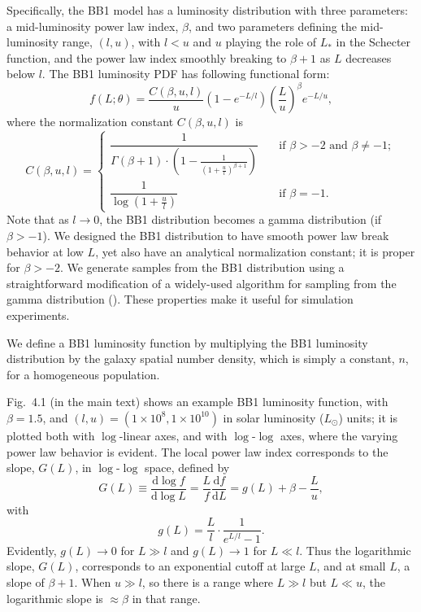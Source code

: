 \documentclass[12pt]{article}
\numberwithin{equation}{section}
\numberwithin{figure}{section}
\numberwithin{table}{section}
\newcommand{\dd}{\textrm{d}}
\newcommand{\lpdf}{f}
\begin{document}
Specifically, the BB1 model has a luminosity distribution with three parameters: a mid-luminosity power law index, $\beta$, and two parameters defining the mid-luminosity range, $(l, u)$, with $l < u$ and  $u$ playing the role of $L_*$ in the Schecter function, and the power law index smoothly breaking to $\beta+1$ as $L$ decreases below $l$.
The BB1 luminosity PDF has following functional form:
\begin{equation}
\label{eq:lumPDF} 
\lpdf(L ; \theta) = 
  \frac{C(\beta,u,l)}{u}\left(1-e^{-L/l}\right) \left(\frac{L}{u}\right)^{\beta} e^{-L/u},
\end{equation}
where the normalization constant $C(\beta,u,l)$ is
\begin{equation}
\label{eq:normLumPDF} 
C(\beta,u,l) =
  \begin{cases} \dfrac{1}{\Gamma(\beta+1)\cdot\left(1-\frac{1}{\left(1+\frac{u}{l}\right)^{\beta+1}}\right)} 
    & \quad \text{if } \beta > -2\text{ and }\beta \ne -1; \\
 \dfrac{1}{\log\left(1+\frac{u}{l}\right)} & \quad \text{if } \beta=-1.
  \end{cases}
\end{equation} 
Note that as $l\rightarrow 0$, the BB1 distribution becomes a gamma distribution (if $\beta > -1$).
We designed the BB1 distribution to have smooth power law break behavior at low $L$, yet also have an analytical normalization constant;
it is proper for $\beta > -2$.
We generate samples from the BB1 distribution using a straightforward modification of a widely-used algorithm for sampling from the gamma distribution (\citealt{ahrens_computer_1974}).
These properties make it useful for simulation experiments.

We define a BB1 luminosity function by multiplying the BB1 luminosity distribution by the galaxy spatial number density, which is simply a constant, $n$, for a homogeneous population.


Fig.~4.1 (in the main text) shows an example BB1 luminosity function, with $\beta = 1.5$, and $(l,u) = (1\times 10^{8}, 1\times 10^{10})$ in solar luminosity ($L_\odot$) units; it is plotted both with $\log$-linear axes, and with $\log$-$\log$ axes, where the varying power law behavior is evident.
The local power law index corresponds to the slope, $G(L)$, in $\log$-$\log$ space, defined by
\begin{equation}
	G(L) \equiv \frac{\dd\log{\lpdf}}{\dd\log{L}} = \frac{L}{\lpdf} \frac{\dd \lpdf}{\dd L} = g(L) + \beta - \frac{L}{u},
\end{equation}
with
\begin{equation}
	g(L) = \frac{L}{l}\cdot\frac{1}{e^{L/l} - 1}.
\end{equation}
Evidently, $g(L) \rightarrow 0$ for $L \gg l$ and $g(L) \rightarrow 1$ for $L \ll l$.
Thus the logarithmic slope, $G(L)$, corresponds to an exponential cutoff at large $L$, and at small $L$, a slope of $\beta + 1$.
When $u\gg l$, so there is a range where $L\gg l$ but $L\ll u$, the logarithmic slope is $\approx \beta$ in that range.
\end{document}
